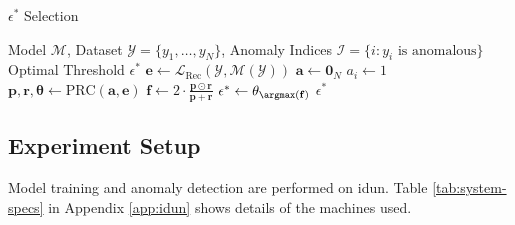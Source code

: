 \begin{algorithm}[!h]
\caption{$\epsilon^*$ Selection}
\label{alg:thresh}
\begin{algorithmic}[1]
\Require Model $\mathcal{M}$, Dataset $\mathcal{Y} = \{y_1, \ldots, y_N\}$, Anomaly Indices $\mathcal{I} = \{i : y_i \text{ is anomalous}\}$
\Ensure Optimal Threshold $\epsilon^*$
\State $\mathbf{e} \gets \mathcal{L}_{\text{Rec}}(\mathcal{Y}, \mathcal{M}(\mathcal{Y}))$ 
\State $\mathbf{a} \gets \mathbf{0}_N$ 
    \State $a_i \gets 1$
\EndFor
\State $\mathbf{p}, \mathbf{r}, \boldsymbol{\theta} \gets \text{PRC}(\mathbf{a}, \mathbf{e})$ 
\State $\mathbf{f} \gets 2 \cdot \frac{\mathbf{p} \odot \mathbf{r}}{\mathbf{p} + \mathbf{r}}$ 
\State $\epsilon^* \gets \theta_{\argmax(\mathbf{f})}$
\State \Return $\epsilon^*$
\end{algorithmic}
\end{algorithm}

\subsection{Experiment Setup}

Model training and anomaly detection are performed on \gls{idun}. Table \ref{tab:system-specs} in Appendix \ref{app:idun} shows details of the machines used. \\

